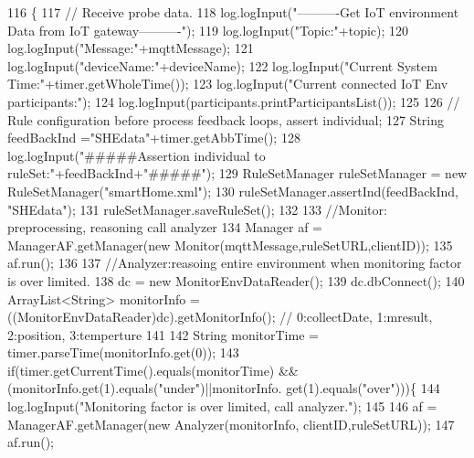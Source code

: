 \begin{DoxyCode}
116                                                                                           \{
117         \textcolor{comment}{// Receive probe data.}
118         log.logInput(\textcolor{stringliteral}{"----------Get IoT environment Data from IoT gateway----------"});
119         log.logInput(\textcolor{stringliteral}{"Topic:"}+topic);
120         log.logInput(\textcolor{stringliteral}{"Message:"}+mqttMessage);
121         log.logInput(\textcolor{stringliteral}{"deviceName:"}+deviceName);
122         log.logInput(\textcolor{stringliteral}{"Current System Time:"}+timer.getWholeTime());
123         log.logInput(\textcolor{stringliteral}{"Current connected IoT Env participants:"});
124         log.logInput(participants.printParticipantsList());
125         
126         \textcolor{comment}{// Rule configuration before process feedback loops, assert individual;}
127         String feedBackInd  =\textcolor{stringliteral}{"SHEdata"}+timer.getAbbTime();
128         log.logInput(\textcolor{stringliteral}{"#####Assertion individual to ruleSet:"}+feedBackInd+\textcolor{stringliteral}{"#####"});
129         RuleSetManager ruleSetManager = \textcolor{keyword}{new} RuleSetManager(\textcolor{stringliteral}{"smartHome.xml"});
130         ruleSetManager.assertInd(feedBackInd, \textcolor{stringliteral}{"SHEdata"});
131         ruleSetManager.saveRuleSet();
132         
133         \textcolor{comment}{//Monitor: preprocessing, reasoning call analyzer}
134         Manager af = ManagerAF.getManager(\textcolor{keyword}{new} Monitor(mqttMessage,ruleSetURL,clientID));
135         af.run();
136         
137         \textcolor{comment}{//Analyzer:reasoing entire environment when monitoring factor is over limited.}
138         dc = \textcolor{keyword}{new} MonitorEnvDataReader();
139         dc.dbConnect();
140         ArrayList<String> monitorInfo = ((MonitorEnvDataReader)dc).getMonitorInfo(); \textcolor{comment}{// 0:collectDate,
       1:mresult, 2:position, 3:temperture}
141         
142         String monitorTime = timer.parseTime(monitorInfo.get(0));
143         \textcolor{keywordflow}{if}(timer.getCurrentTime().equals(monitorTime) && (monitorInfo.get(1).equals(\textcolor{stringliteral}{"under"})||monitorInfo.
      get(1).equals(\textcolor{stringliteral}{"over"})))\{
144             log.logInput(\textcolor{stringliteral}{"Monitoring factor is over limited, call analyzer."});
145             
146             af = ManagerAF.getManager(\textcolor{keyword}{new} Analyzer(monitorInfo, clientID,ruleSetURL));
147             af.run();

\end{DoxyCode}
